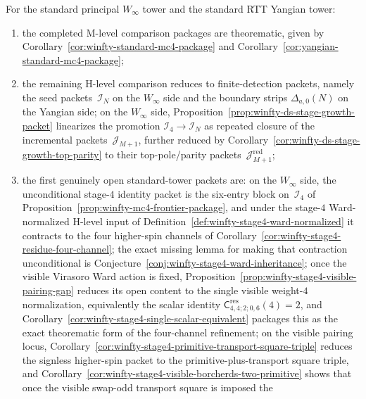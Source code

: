 \begin{proposition}
\label{prop:paired-standard-mc4-frontier}
For the standard principal
\texorpdfstring{$W_\infty$}{W_infty} tower and the standard RTT Yangian
tower:
\begin{enumerate}[label=\textup{(\alph*)}]
\item the completed M-level comparison packages are theorematic,
  given by
  Corollary~\ref{cor:winfty-standard-mc4-package} and
  Corollary~\ref{cor:yangian-standard-mc4-package};
\item the remaining H-level comparison reduces to finite-detection
  packets, namely the seed packets~$\mathcal{I}_N$ on the
  \texorpdfstring{$W_\infty$}{W_infty} side and the boundary strips
  $\Delta_{a,0}(N)$ on the Yangian side; on the
  \texorpdfstring{$W_\infty$}{W_infty} side,
  Proposition~\ref{prop:winfty-ds-stage-growth-packet} linearizes the
  promotion $\mathcal{I}_4\to\mathcal{I}_N$ as repeated closure of the
  incremental packets~$\mathcal{J}_{M+1}$, further reduced by
  Corollary~\ref{cor:winfty-ds-stage-growth-top-parity} to their
  top-pole/parity packets~$\mathcal{J}_{M+1}^{\mathrm{red}}$;
\item the first genuinely open standard-tower packets are:
  on the \texorpdfstring{$W_\infty$}{W_infty} side, the unconditional
  stage-$4$ identity packet is the six-entry block on~$\mathcal{I}_4$
  of Proposition~\ref{prop:winfty-mc4-frontier-package}, and under the
  stage-$4$ Ward-normalized H-level input of
  Definition~\ref{def:winfty-stage4-ward-normalized} it contracts to
  the four higher-spin channels of
  Corollary~\ref{cor:winfty-stage4-residue-four-channel}; the exact
  missing lemma for making that contraction unconditional is
  Conjecture~\ref{conj:winfty-stage4-ward-inheritance}; once the
  visible Virasoro Ward action is fixed,
  Proposition~\ref{prop:winfty-stage4-visible-pairing-gap} reduces its
  open content to the single visible weight-$4$ normalization,
  equivalently the scalar identity
  \(\mathsf{C}^{\mathrm{res}}_{4,4;2;0,6}(4)=2\), and
  Corollary~\ref{cor:winfty-stage4-single-scalar-equivalent}
  packages this as the exact theorematic form of the four-channel
  refinement; on the visible pairing locus,
  Corollary~\ref{cor:winfty-stage4-primitive-transport-square-triple}
  reduces the signless higher-spin packet to the primitive-plus-transport
  square triple, and
  Corollary~\ref{cor:winfty-stage4-visible-borcherds-two-primitive}
  shows that once the visible swap-odd transport square is imposed the

\end{enumerate}
\end{proposition}
